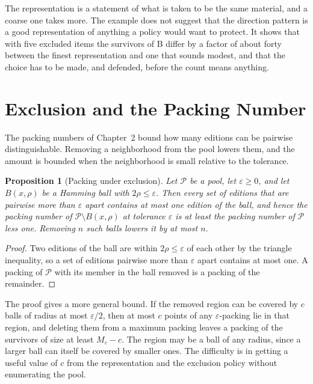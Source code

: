 \documentclass[11pt,twoside,openright]{book}
\theoremstyle{plain}
\newtheorem{proposition}[theorem]{Proposition}
\theoremstyle{definition}
\theoremstyle{remark}
\begin{document}
The representation is a statement of what is taken to be the same material, and a coarse one takes more. The example does not suggest that the direction pattern is a good representation of anything a policy would want to protect. It shows that with five excluded items the survivors of B differ by a factor of about forty between the finest representation and one that sounds modest, and that the choice has to be made, and defended, before the count means anything.

\section{Exclusion and the Packing Number}\label{sec:pack15}

The packing numbers of Chapter~2 bound how many editions can be pairwise distinguishable. Removing a neighborhood from the pool lowers them, and the amount is bounded when the neighborhood is small relative to the tolerance.

\begin{proposition}[Packing under exclusion]\label{prop:packexcl}
Let $\mathcal P$ be a pool, let $\varepsilon\ge0$, and let $B(x,\rho)$ be a Hamming ball with $2\rho\le\varepsilon$. Then every set of editions that are pairwise more than $\varepsilon$ apart contains at most one edition of the ball, and hence the packing number of $\mathcal P\setminus B(x,\rho)$ at tolerance $\varepsilon$ is at least the packing number of $\mathcal P$ less one. Removing $n$ such balls lowers it by at most $n$.
\end{proposition}

\begin{proof}
Two editions of the ball are within $2\rho\le\varepsilon$ of each other by the triangle inequality, so a set of editions pairwise more than $\varepsilon$ apart contains at most one. A packing of $\mathcal P$ with its member in the ball removed is a packing of the remainder.
\end{proof}

The proof gives a more general bound. If the removed region can be covered by $c$ balls of radius at most $\varepsilon/2$, then at most $c$ points of any $\varepsilon$-packing lie in that region, and deleting them from a maximum packing leaves a packing of the survivors of size at least $M_\varepsilon-c$. The region may be a ball of any radius, since a larger ball can itself be covered by smaller ones. The difficulty is in getting a useful value of $c$ from the representation and the exclusion policy without enumerating the pool.
\end{document}
